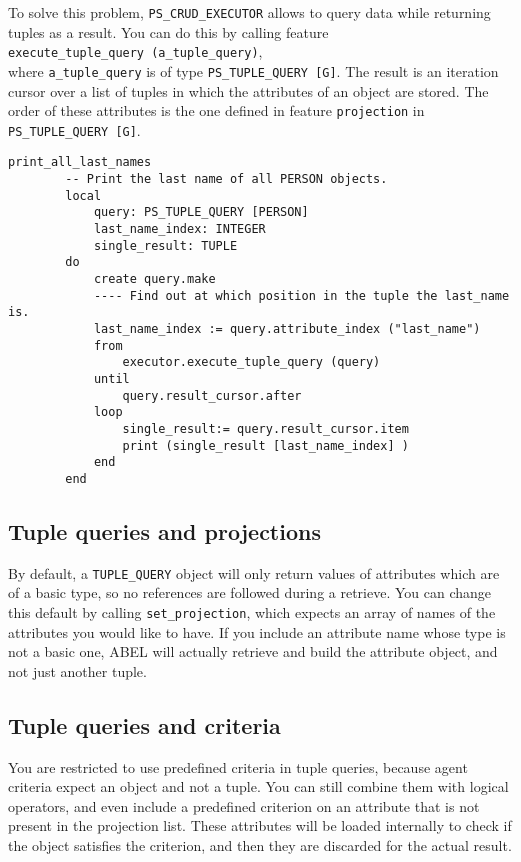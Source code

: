 \documentclass[a4paper,12pt]{report}
\begin{document}
To solve this problem, \lstinline{PS_CRUD_EXECUTOR} allows to query data while returning tuples as a result. You can do this by calling feature\\

\lstinline{execute_tuple_query (a_tuple_query)}, \\

where \lstinline{a_tuple_query} is of type \lstinline{PS_TUPLE_QUERY [G]}.
The result is an iteration cursor over a list of tuples in which the attributes of an object are stored. The order of these attributes is the one defined in feature \lstinline{projection} in \lstinline{PS_TUPLE_QUERY [G]}.

\begin{lstlisting}[language=OOSC2Eiffel, captionpos=b, caption={Using tuple queries.}, label={lst:tuple_query_simple}]
	print_all_last_names
		-- Print the last name of all PERSON objects.
		local
			query: PS_TUPLE_QUERY [PERSON]
			last_name_index: INTEGER
			single_result: TUPLE
		do
			create query.make
			---- Find out at which position in the tuple the last_name is.
			last_name_index := query.attribute_index ("last_name")
			from
				executor.execute_tuple_query (query)
			until
				query.result_cursor.after
			loop
				single_result:= query.result_cursor.item
				print (single_result [last_name_index] )
			end			
		end
\end{lstlisting}

\subsection{Tuple queries and projections}
By default, a \lstinline!TUPLE_QUERY! object will only return values of attributes which are of a basic type, so no references are followed during a retrieve.
You can change this default by calling \lstinline{set_projection}, which expects an array of names of the attributes you would like to have.
If you include an attribute name whose type is not a basic one, ABEL will actually retrieve and build the attribute object, and not just another tuple.

\subsection{Tuple queries and criteria}
You are restricted to use predefined criteria in tuple queries, because agent criteria expect an object and not a tuple. You can still combine them with logical operators, and even include a predefined criterion on an attribute that is not present in the projection list. These attributes will be loaded internally to check if the object satisfies the criterion, and then they are discarded for the actual result.
\end{document}
